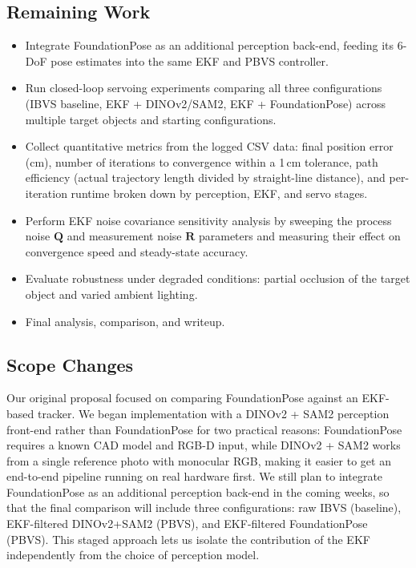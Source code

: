 \documentclass[letterpaper, 10 pt, conference]{ieeeconf}  %
\begin{document}
\subsection{Remaining Work}
\begin{itemize}
\item Integrate FoundationPose as an additional perception back-end, feeding its 6-DoF pose estimates into the same EKF and PBVS controller.
\item Run closed-loop servoing experiments comparing all three configurations (IBVS baseline, EKF + DINOv2/SAM2, EKF + FoundationPose) across multiple target objects and starting configurations.
\item Collect quantitative metrics from the logged CSV data: final position error (cm), number of iterations to convergence within a 1\,cm tolerance, path efficiency (actual trajectory length divided by straight-line distance), and per-iteration runtime broken down by perception, EKF, and servo stages.
\item Perform EKF noise covariance sensitivity analysis by sweeping the process noise $\mathbf{Q}$ and measurement noise $\mathbf{R}$ parameters and measuring their effect on convergence speed and steady-state accuracy.
\item Evaluate robustness under degraded conditions: partial occlusion of the target object and varied ambient lighting.
\item Final analysis, comparison, and writeup.
\end{itemize}

\subsection{Scope Changes}
Our original proposal focused on comparing FoundationPose against an EKF-based tracker. We began implementation with a DINOv2 + SAM2 perception front-end rather than FoundationPose for two practical reasons: FoundationPose requires a known CAD model and RGB-D input, while DINOv2 + SAM2 works from a single reference photo with monocular RGB, making it easier to get an end-to-end pipeline running on real hardware first. We still plan to integrate FoundationPose as an additional perception back-end in the coming weeks, so that the final comparison will include three configurations: raw IBVS (baseline), EKF-filtered DINOv2+SAM2 (PBVS), and EKF-filtered FoundationPose (PBVS). This staged approach lets us isolate the contribution of the EKF independently from the choice of perception model.
\end{document}
